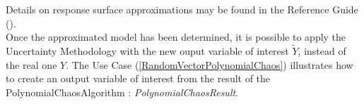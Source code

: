 Details on response surface approximations may be found in the Reference Guide ().\\


Once the approximated model has been determined, it is possible to apply the Uncertainty Methodology with the new ouput variable of interest $\tilde{Y}$, instead of  the real one $Y$. The Use Case (\ref{RandomVectorPolynomialChaos}) illustrates how to create an output variable of interest from the result of the PolynomialChaosAlgorithm : {\itshape PolynomialChaosResult}.\\

